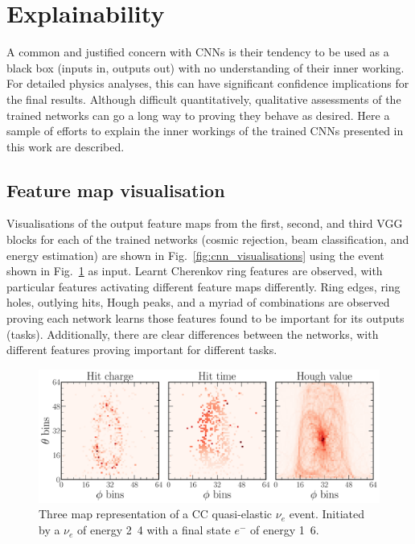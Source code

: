 \section{Explainability} %
\label{sec:results_explain} %

A common and justified concern with CNNs is their tendency to be used as a black box (inputs in,
outputs out) with no understanding of their inner working. For detailed physics analyses, this can
have significant confidence implications for the final results. Although difficult quantitatively,
qualitative assessments of the trained networks can go a long way to proving they behave as
desired. Here a sample of efforts to explain the inner workings of the trained CNNs presented in
this work are described.

\subsection*{Feature map visualisation} %

Visualisations of the output feature maps from the first, second, and third VGG blocks for each of
the trained networks (cosmic rejection, beam classification, and energy estimation) are shown in
Fig.~\ref{fig:cnn_visualisations} using the event shown in Fig.~\ref{fig:explain_example_event} as
input. Learnt Cherenkov ring features are observed, with particular features activating different
feature maps differently. Ring edges, ring holes, outlying hits, Hough peaks, and a myriad of
combinations are observed proving each network learns those features found to be important for its
outputs (tasks). Additionally, there are clear differences between the networks, with different
features proving important for different tasks.

\begin{figure} %
    \includegraphics[width=\textwidth]{diagrams/7-results/explain_example_event.pdf}
    \caption[Example CC quasi-elastic $\nu_{e}$ event for explainability]
    {Three map representation of a CC quasi-elastic $\nu_{e}$ event. Initiated by a $\nu_{e}$ of
        energy \unit{2.4}{\GeV} with a final state $e^{-}$ of energy \unit{1.6}{\GeV}.}
    \label{fig:explain_example_event}
\end{figure}

